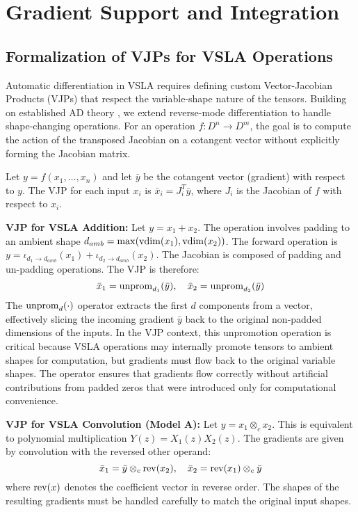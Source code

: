 \section{Gradient Support and Integration}  
\label{sec:gradients}

\subsection{Formalization of VJPs for VSLA Operations}
Automatic differentiation in VSLA requires defining custom Vector-Jacobian Products (VJPs) that respect the variable-shape nature of the tensors. Building on established AD theory \cite{GriewankWalther2008,Pearlmutter1994}, we extend reverse-mode differentiation to handle shape-changing operations. For an operation \(f: D^n \to D^m\), the goal is to compute the action of the transposed Jacobian on a cotangent vector without explicitly forming the Jacobian matrix.

Let \(y = f(x_1, \dots, x_n)\) and let \(\bar{y}\) be the cotangent vector (gradient) with respect to \(y\). The VJP for each input \(x_i\) is \(\bar{x}_i = J_i^T \bar{y}\), where \(J_i\) is the Jacobian of \(f\) with respect to \(x_i\).

\textbf{VJP for VSLA Addition:} Let \(y = x_1 + x_2\). The operation involves padding to an ambient shape \(d_{amb} = \max(\operatorname{vdim}(x_1), \operatorname{vdim}(x_2))\). The forward operation is \(y = \iota_{d_1 \to d_{amb}}(x_1) + \iota_{d_2 \to d_{amb}}(x_2)\). The Jacobian is composed of padding and un-padding operations. The VJP is therefore:
\[
\bar{x}_1 = \operatorname{unprom}_{d_1}(\bar{y}), \quad \bar{x}_2 = \operatorname{unprom}_{d_2}(\bar{y})
\]
The \(\operatorname{unprom}_{d}(\cdot)\) operator extracts the first $d$ components from a vector, effectively slicing the incoming gradient \(\bar{y}\) back to the original non-padded dimensions of the inputs. In the VJP context, this unpromotion operation is critical because VSLA operations may internally promote tensors to ambient shapes for computation, but gradients must flow back to the original variable shapes. The operator ensures that gradients flow correctly without artificial contributions from padded zeros that were introduced only for computational convenience.

\textbf{VJP for VSLA Convolution (Model A):} Let \(y = x_1 \otimes_c x_2\). This is equivalent to polynomial multiplication \(Y(z) = X_1(z)X_2(z)\). The gradients are given by convolution with the reversed other operand:
\[
\bar{x}_1 = \bar{y} \otimes_c \operatorname{rev}(x_2), \quad \bar{x}_2 = \operatorname{rev}(x_1) \otimes_c \bar{y}
\]
where \(\operatorname{rev}(x)\) denotes the coefficient vector in reverse order. The shapes of the resulting gradients must be handled carefully to match the original input shapes.

